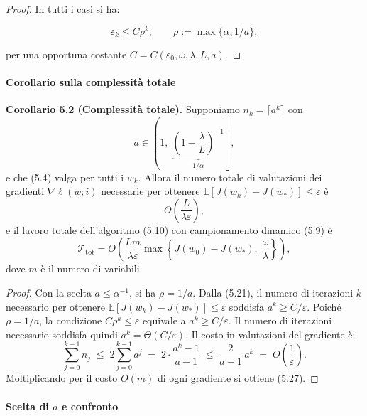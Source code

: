 \documentclass[a4paper,12pt]{article}
\numberwithin{equation}{section}
\numberwithin{figure}{section}
\numberwithin{table}{section}
\begin{document}
\begin{proof}
In tutti i casi si ha:

\begin{equation}
\varepsilon_k \le C \rho^k, \qquad \rho := \max\{\alpha, 1/a\}, \tag{5.25}
\end{equation}

per una opportuna costante $C = C(\varepsilon_0, \omega, \lambda, L, a)$.


\end{proof}


\paragraph{Corollario sulla complessità totale}

\begin{corollarybox}
  \textbf{Corollario 5.2 (Complessità totale).}
  Supponiamo \(n_k = \lceil a^k \rceil\) con
  \[
  a \in \left(1,\; \underbrace{\left(1 - \frac{\lambda}{L}\right)^{-1}}_{1/\alpha}\right],
  \]
  e che (5.4) valga per tutti i \(w_k\). Allora il numero totale di valutazioni dei gradienti \(\nabla \ell(w;i)\) necessarie per ottenere \(\mathbb{E}[J(w_k) - J(w_*)] \le \varepsilon\) è
  \[
  O\!\left(\frac{L}{\lambda \varepsilon}\right), \tag{5.26}
  \]
  e il lavoro totale dell'algoritmo (5.10) con campionamento dinamico (5.9) è
  \[
  \mathcal{T}_{\mathrm{tot}} = O\!\left(\frac{L m}{\lambda \varepsilon} \max\left\{J(w_0) - J(w_*),\; \frac{\omega}{\lambda}\right\}\right), \tag{5.27}
  \]
  dove \(m\) è il numero di variabili.
\end{corollarybox}

\begin{proof}
Con la scelta \(a \le \alpha^{-1}\), si ha \(\rho = 1/a\). Dalla (5.21), il numero di iterazioni \(k\) necessario per ottenere \(\mathbb{E}[J(w_k) - J(w_*)] \le \varepsilon\) soddisfa \(a^k \ge C/\varepsilon\). Poiché \(\rho = 1/a\), la condizione \(C\rho^k \le \varepsilon\) equivale a \(a^k \ge C/\varepsilon\). Il numero di iterazioni necessario soddisfa quindi \(a^k = \Theta(C/\varepsilon)\). Il costo in valutazioni del gradiente è:
\[
\sum_{j=0}^{k-1} n_j \;\le\; 2\sum_{j=0}^{k-1} a^j
\;=\; 2\cdot \frac{a^k - 1}{a-1}
\;\le\; \frac{2}{a-1}\, a^k
\;=\; O\!\left(\frac{1}{\varepsilon}\right).\]
Moltiplicando per il costo \(O(m)\) di ogni gradiente si ottiene (5.27).
\end{proof}


\paragraph{Scelta di \(a\) e confronto}
\end{document}
